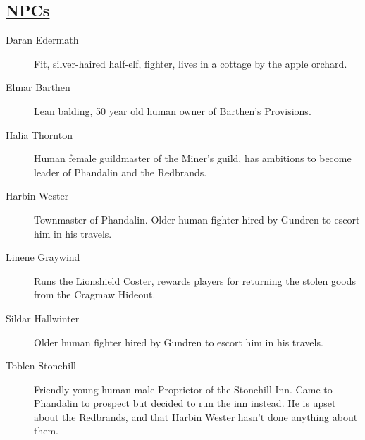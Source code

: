 \subsection*{\underline{NPCs}}
\begin{description}
	\item[Daran Edermath] Fit, silver-haired half-elf, fighter, lives in a cottage by the apple orchard.
	\item[Elmar Barthen] Lean balding, 50 year old human owner of Barthen's Provisions.
	\item[Halia Thornton] Human female guildmaster of the Miner's guild, has ambitions to become leader of Phandalin and the Redbrands.
	\item[Harbin Wester] Townmaster of Phandalin. Older human fighter hired by Gundren to escort him in his travels.
	\item[Linene Graywind] Runs the Lionshield Coster, rewards players for returning the stolen goods from the Cragmaw Hideout.
	\item[Sildar Hallwinter] Older human fighter hired by Gundren to escort him in his travels.
	\item[Toblen Stonehill] Friendly young human male Proprietor of the Stonehill Inn. Came to Phandalin to prospect but decided to run the inn instead. He is upset about the Redbrands, and that Harbin Wester hasn't done anything about them.
\end{description}